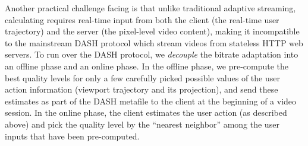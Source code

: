 Another practical challenge facing \name is that unlike traditional adaptive streaming, calculating \vrjnd requires real-time input from both the client (the real-time user trajectory) and the server (the pixel-level video content), making it incompatible to the mainstream DASH protocol which stream videos from stateless HTTP web servers. 
To run \name over the DASH protocol, we {\em decouple} the bitrate adaptation into an offline phase and an online phase.
In the offline phase, we pre-compute the best quality levels for only a few carefully picked possible values of the user action information (viewport trajectory and its projection), and send these estimates as part of the DASH metafile to the client at the beginning of a video session. 
In the online phase, the client estimates the user action (as described above) and pick the quality level by the ``nearest neighbor'' among the user inputs that have been pre-computed. 


